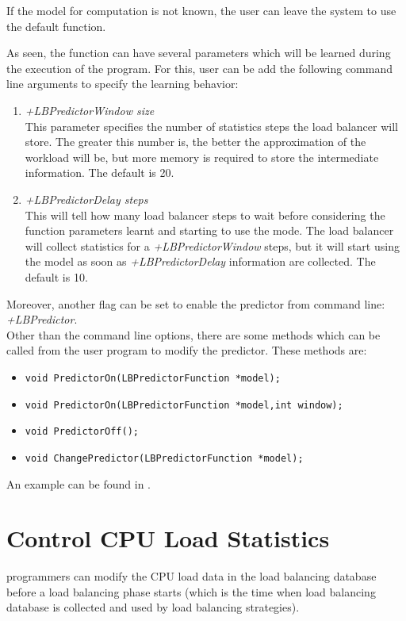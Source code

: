 If the model for computation is not known, the user can leave the system to
use the default function.

As seen, the function can have several parameters which will be learned during
the execution of the program. For this, user can be add the following command
line arguments to specify the learning behavior:
\begin{enumerate}
\item {\em +LBPredictorWindow size}\\
This parameter specifies the number of statistics steps the load balancer will
store.  The greater this number is, the better the
approximation of the workload will be, but more memory is required to store
the intermediate information. The default is 20.
\item {\em +LBPredictorDelay steps}\\
This will tell how many load balancer steps to wait before considering the
function parameters learnt and starting to use the mode. The load balancer will
collect statistics for a {\em +LBPredictorWindow} steps, but it will start using
the model as soon as {\em +LBPredictorDelay} information are collected. The
default is 10.
\end{enumerate}
Moreover, another flag can be set to enable the predictor from command line: {\em
+LBPredictor}.\\
Other than the command line options, there are some methods
which can be called from the user program to modify the predictor. These methods are:
\begin{itemize}
\item {\tt void PredictorOn(LBPredictorFunction *model);}
\item {\tt void PredictorOn(LBPredictorFunction *model,int window);}
\item {\tt void PredictorOff();}
\item {\tt void ChangePredictor(LBPredictorFunction *model);}
\end{itemize}

An example can be found in .
\section{Control CPU Load Statistics}

\charmpp{} programmers can modify the CPU load data in the load balancing database
before a load balancing phase starts (which is the time when load balancing
database is collected and used by load balancing strategies).

